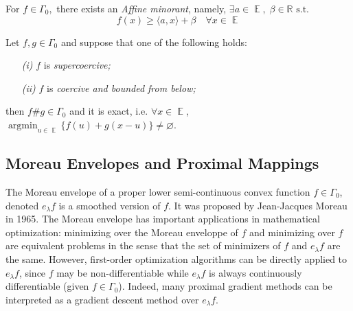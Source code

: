 \documentclass{tufte-handout}
\DeclareMathOperator{\argmin}{argmin}
\DeclareMathOperator{\E}{\mathbb{E}}
\begin{document}
{\begin{proposition}
  For $f \in \Gamma_0, $ there exists an \textit{Affine minorant}, namely, $\exists a\in \E , \; \beta \in \mathbb{R} \text{ s.t. }$ 
  $$ f(x) \geq \langle a, x \rangle + \beta \quad \forall x \in \E $$
\end{proposition}
\begin{theorem}
  Let $f , g \in \Gamma_0$ and suppose that one of the following holds: 
  \begin{enumerate}
    \item[\it (i)] $f$ is \textit{supercoercive;}
    \item[\it (ii)] $f$ is \textit{coercive and bounded from below;} 
  \end{enumerate}
  then $f \# g \in \Gamma_0$ and it is exact, i.e. $\forall x \in \E$, $\argmin_{u\in \E} \{ f(u)+g(x-u) \}\neq \varnothing$. 
  
\end{theorem}
\subsection{Moreau Envelopes and Proximal Mappings}%
  \label{sub:Moreau Envelopes and Proximal Mappings}
The Moreau envelope of a proper lower semi-continuous convex function $f \in \Gamma_0$, denoted $e_\lambda f$ is a smoothed version of $f$. It was proposed by Jean-Jacques Moreau in 1965. The Moreau envelope has important applications in mathematical optimization: minimizing over the Moreau enveloppe of $f$ and minimizing over $f$ are equivalent problems in the sense that the set of minimizers of $f$ and 
 $e_\lambda f$ are the same. However, first-order optimization algorithms can be directly applied to 
 $e_\lambda f$, since $f$ may be non-differentiable while $e_\lambda f$ is always continuously differentiable (given $f \in \Gamma_0$). Indeed, many proximal gradient methods can be interpreted as a gradient descent method over $e_\lambda f$.
  
}
\end{document}
